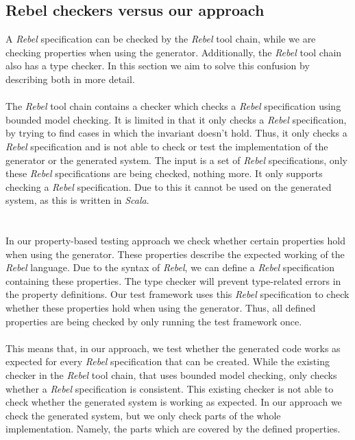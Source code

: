 \subsection{Rebel checkers versus our approach}
A \textit{Rebel} specification can be checked by the \textit{Rebel} tool chain,
while we are checking properties when using the generator. Additionally, the
\textit{Rebel} tool chain also has a type checker. In this section we aim to
solve this confusion by describing both in more detail.\\
\\
The \textit{Rebel} tool chain contains a checker which checks a \textit{Rebel} specification using bounded model checking. It is limited in that it only checks a \textit{Rebel} specification, by trying to find cases in which the invariant doesn't hold. Thus, it only checks a \textit{Rebel} specification and is not able to check or test the implementation of the generator or the generated system. The input is a set of \textit{Rebel} specifications, only these \textit{Rebel} specifications are being checked, nothing more. It only supports checking a \textit{Rebel} specification. Due to this it cannot be used on the generated system, as this is written in \textit{Scala}.\\
\\
\\
In our property-based testing approach we check whether certain properties hold when using the generator. These properties describe the expected working of the \textit{Rebel} language. Due to the syntax of \textit{Rebel}, we can define a \textit{Rebel} specification containing these properties. The type checker will prevent type-related errors in the property definitions. Our test framework uses this \textit{Rebel} specification to check whether these properties hold when using the generator. Thus, all defined properties are being checked by only running the test framework once.\\
\\
This means that, in our approach, we test whether the generated code works as expected for every \textit{Rebel} specification that can be created. While the existing checker in the \textit{Rebel} tool chain, that uses bounded model checking, only checks whether a \textit{Rebel} specification is consistent. This existing checker is not able to check whether the generated system is working as expected. In our approach we check the generated system, but we only check parts of the whole implementation. Namely, the parts which are covered by the defined properties.

